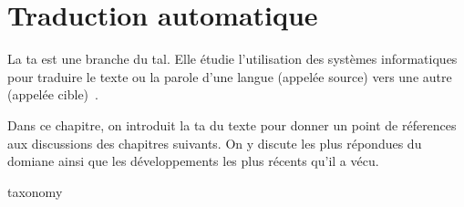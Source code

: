 \chapter{Traduction automatique}


La \acrfull{ta} est une branche du \acrfull{tal}.
Elle étudie l'utilisation des systèmes informatiques pour traduire le texte ou la parole d'une langue (appelée source) vers une autre (appelée cible)~\cite{routledge}.

Dans ce chapitre, on introduit la \acrlong{ta} du texte pour donner un point de réferences aux discussions des chapitres suivants.
On y discute les plus répondues du domiane 
ainsi que les développements les plus récents qu'il a vécu.

{taxonomy}